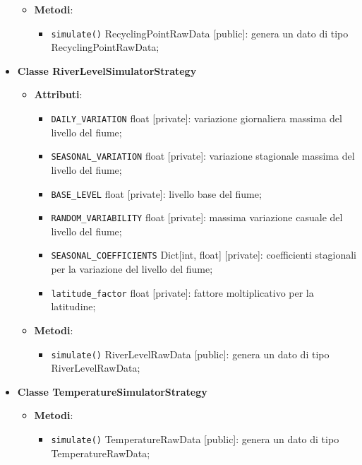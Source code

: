 \begin{itemize}
\begin{itemize}
\begin{itemize}
		            \end{itemize}
		      \item \textbf{Metodi}:
		            \begin{itemize}
			            \item \texttt{simulate()} RecyclingPointRawData [public]: genera un dato di tipo\\ RecyclingPointRawData;
		            \end{itemize}
	      \end{itemize}
	\item \textbf{Classe RiverLevelSimulatorStrategy}
	      \begin{itemize}
		      \item \textbf{Attributi}:
		            \begin{itemize}
			            \item \texttt{DAILY\_VARIATION} float [private]: variazione giornaliera massima del livello del fiume;
			            \item \texttt{SEASONAL\_VARIATION} float [private]: variazione stagionale massima del livello del fiume;
			            \item \texttt{BASE\_LEVEL} float [private]: livello base del fiume;
			            \item \texttt{RANDOM\_VARIABILITY} float [private]: massima variazione casuale del livello del fiume;
			            \item \texttt{SEASONAL\_COEFFICIENTS} Dict[int, float] [private]: coefficienti stagionali per la variazione del livello del fiume;
			            \item \texttt{latitude\_factor} float [private]: fattore moltiplicativo per la latitudine;
		            \end{itemize}
		      \item \textbf{Metodi}:
		            \begin{itemize}
			            \item \texttt{simulate()} RiverLevelRawData [public]: genera un dato di tipo RiverLevelRawData;
		            \end{itemize}
	      \end{itemize}
	\item \textbf{Classe TemperatureSimulatorStrategy}
	      \begin{itemize}
		      \item \textbf{Metodi}:
		            \begin{itemize}
			            \item \texttt{simulate()} TemperatureRawData [public]: genera un dato di tipo\\ TemperatureRawData;

\end{itemize}
\end{itemize}
\end{itemize}

